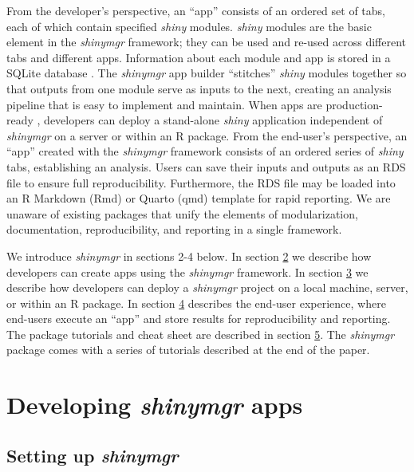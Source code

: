 From the developer's perspective, an ``app'' consists of an ordered set of tabs, each of which contain specified \emph{shiny} modules. \emph{shiny} modules are the basic element in the \emph{shinymgr} framework; they can be used and re-used across different tabs and different apps. Information about each module and app is stored in a SQLite database \citep{sqlite2020hipp}. The \emph{shinymgr} app builder ``stitches'' \emph{shiny} modules together so that outputs from one module serve as inputs to the next, creating an analysis pipeline that is easy to implement and maintain. When apps are production-ready , developers can deploy a stand-alone \emph{shiny} application independent of \emph{shinymgr} on a server or within an R package. From the end-user's perspective, an ``app'' created with the \emph{shinymgr} framework consists of an ordered series of \emph{shiny} tabs, establishing an analysis. Users can save their inputs and outputs as an RDS file to ensure full reproducibility. Furthermore, the RDS file may be loaded into an R Markdown (Rmd) or Quarto (qmd) template for rapid reporting. We are unaware of existing packages that unify the elements of modularization, documentation, reproducibility, and reporting in a single framework.

We introduce \emph{shinymgr} in sections 2-4 below. In section \hyperref[appdev]{2} we describe how developers can create apps using the \emph{shinymgr} framework. In section \hyperref[appdeploy]{3} we describe how developers can deploy a \emph{shinymgr} project on a local machine, server, or within an R package. In section \hyperref[appUsing]{4} describes the end-user experience, where end-users execute an ``app'' and store results for reproducibility and reporting. The package tutorials and cheat sheet are described in section \hyperref[tuts]{5}. The \emph{shinymgr} package comes with a series of  \citep{learnr} tutorials described at the end of the paper.

\section{\texorpdfstring{Developing \emph{shinymgr} apps}{Developing shinymgr apps}}\label{appdev}

\subsection{\texorpdfstring{Setting up \emph{shinymgr}}{Setting up shinymgr}}\label{setting-up-shinymgr}

